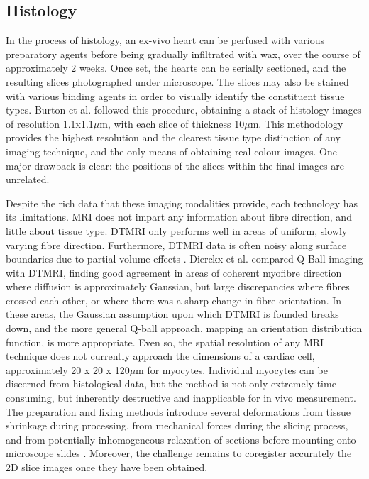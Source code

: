   \subsection{Histology} %
  \label{sub:histology}
  In the process of histology, an ex-vivo heart can be perfused with various preparatory agents before being gradually infiltrated with wax, over the course of approximately 2 weeks. Once set, the hearts can be serially sectioned, and the resulting slices photographed under microscope. The slices may also be stained with various binding agents in order to visually identify the constituent tissue types. Burton et al. \cite{Burton2006} followed this procedure, obtaining a stack of histology images of resolution 1.1x1.1$\mu$m, with each slice of thickness 10$\mu$m. This  methodology provides the highest resolution and the clearest tissue type distinction of any imaging technique, and the only means of obtaining real colour images. One major drawback is clear: the positions of the slices within the final images are unrelated.
  
  Despite the rich data that these imaging modalities provide, each technology has its limitations. MRI does not impart any information about fibre direction, and little about tissue type. DTMRI only performs well in areas of uniform, slowly varying fibre direction. Furthermore, DTMRI data is often noisy along surface boundaries due to partial volume effects \cite{Alexander2001}. Dierckx et al. \cite{Dierckx2009} compared Q-Ball imaging with DTMRI, finding good agreement in areas of coherent myofibre direction where diffusion is approximately Gaussian, but large discrepancies where fibres crossed each other, or where there was a sharp change in fibre orientation. In these areas, the Gaussian assumption upon which DTMRI is founded breaks down, and the more general Q-ball approach, mapping an orientation distribution function, is more appropriate. Even so, the spatial resolution of any MRI technique does not currently approach the dimensions of a cardiac cell, approximately 20 x 20 x 120$\mu$m for myocytes. Individual myocytes can be discerned from histological data, but the method is not only extremely time consuming, but inherently destructive and  inapplicable for in vivo measurement. The preparation and fixing methods introduce several deformations from tissue shrinkage during processing, from mechanical forces during the slicing process, and from potentially inhomogeneous relaxation of sections before mounting onto microscope slides \cite{Burton2006}. Moreover, the challenge remains to coregister accurately the 2D slice images once they have been obtained.

